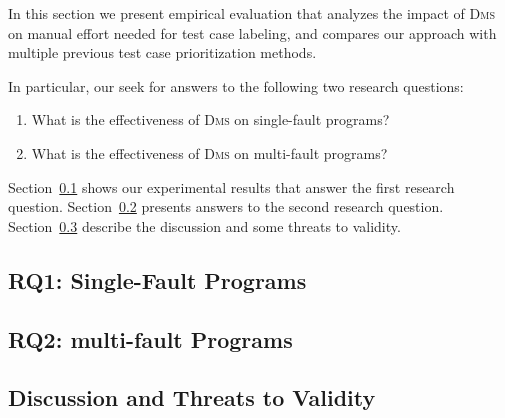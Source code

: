 In this section we present empirical evaluation that analyzes the impact of \textsc{Dms} on manual effort needed for test case labeling, and compares our approach with multiple previous test case prioritization methods.

In particular, our seek for answers to the following two research questions:


\begin{enumerate}[RQ1]
\item What is the effectiveness of \textsc{Dms} on single-fault programs?
\item What is the effectiveness of \textsc{Dms} on multi-fault programs?
\end{enumerate}

Section~\ref{sec.rq1} shows our experimental results that answer the first research question. Section~\ref{sec.rq2} presents answers to the second research question. Section~\ref{sec.exp.threats} describe the discussion and some threats to validity.


\subsection{RQ1: Single-Fault Programs}\label{sec.rq1}


\subsection{RQ2: multi-fault Programs}\label{sec.rq2}


\subsection{Discussion and Threats to Validity}\label{sec.exp.threats}

